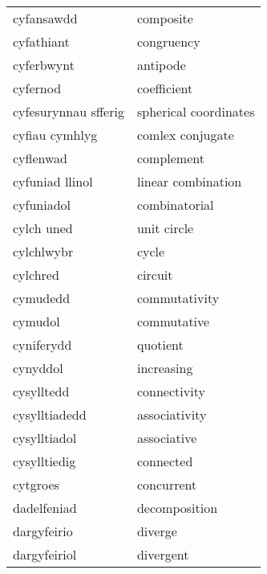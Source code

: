 \begin{supertabular}{p{0.22\textwidth}p{0.22\textwidth}}
                     cyfansawdd &                        composite \\
                     cyfathiant &                       congruency \\
                     cyferbwynt &                         antipode \\
                       cyfernod &                      coefficient \\
           cyfesurynnau sfferig &            spherical coordinates \\
                 cyfiau cymhlyg &                 comlex conjugate \\
                      cyflenwad &                       complement \\
                cyfuniad llinol &               linear combination \\
                     cyfuniadol &                    combinatorial \\
                     cylch uned &                      unit circle \\
                     cylchlwybr &                            cycle \\
                       cylchred &                          circuit \\
                       cymudedd &                    commutativity \\
                        cymudol &                      commutative \\
                     cyniferydd &                         quotient \\
                       cynyddol &                       increasing \\
                     cysylltedd &                     connectivity \\
                  cysylltiadedd &                    associativity \\
                   cysylltiadol &                      associative \\
                   cysylltiedig &                        connected \\
                       cytgroes &                       concurrent \\
                    dadelfeniad &                    decomposition \\
                    dargyfeirio &                          diverge \\
                   dargyfeiriol &                        divergent \\

\end{supertabular}
